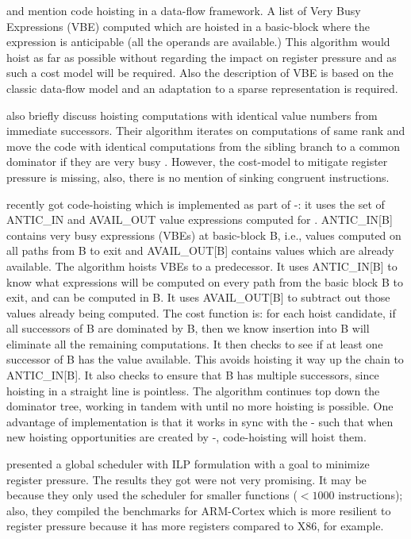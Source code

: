 \documentclass[sigplan,10pt,review,anonymous]{acmart}\settopmatter{printfolios=true,printccs=false,printacmref=false}
\begin{document}
\citet{dhamdhere1988fast} and \citet{steven1997advanced} mention
code hoisting in a data-flow framework. A list of Very Busy Expressions (VBE)
computed which are hoisted in a basic-block where the expression is
anticipable (all the operands are available.) This algorithm would hoist as far
as possible without regarding the impact on register pressure and as such a cost
model will be required.  Also the description of VBE is based on the classic
data-flow model and an adaptation to a sparse \SSA{} representation is required.

\citet{rosen1988global} also briefly discuss hoisting computations with
identical value numbers from immediate successors. Their algorithm iterates on
computations of same rank and move the code with identical computations from the
sibling branch to a common dominator if they are very busy
\cite{steven1997advanced}. However, the cost-model to mitigate register pressure
is missing, also, there is no mention of sinking congruent instructions.

\GCC{} recently got code-hoisting \cite{GCCCodeHoisting} which is implemented as
part of \GVN{}-\PRE{}: it uses the set of ANTIC\_IN and AVAIL\_OUT value
expressions computed for \PRE{}. ANTIC\_IN[B] contains very busy expressions
(VBEs) at basic-block B, i.e., values computed on all paths from B to exit and
AVAIL\_OUT[B] contains values which are already available. The algorithm hoists
VBEs to a predecessor.  It uses ANTIC\_IN[B] to know what expressions will be
computed on every path from the basic block B to exit, and can be computed in B.
It uses AVAIL\_OUT[B] to subtract out those values already being computed.  The
cost function is: for each hoist candidate, if all successors of B are dominated
by B, then we know insertion into B will eliminate all the remaining
computations.  It then checks to see if at least one successor of B has the
value available.  This avoids hoisting it way up the chain to ANTIC\_IN[B].  It
also checks to ensure that B has multiple successors, since hoisting in a
straight line is pointless.  The algorithm continues top down the dominator
tree, working in tandem with \PRE{} until no more hoisting is possible.  One
advantage of \GCC{} implementation is that it works in sync with the
\GVN{}-\PRE{} such that when new hoisting opportunities are created by
\GVN{}-\PRE{}, code-hoisting will hoist them.

\citet{barany2013} presented a global scheduler with ILP formulation with
a goal to minimize register pressure. The results they got were not very
promising. It may be because they only used the scheduler for smaller functions
($<1000$ instructions); also, they compiled the benchmarks for ARM-Cortex which
is more resilient to register pressure because it has more registers compared to
X86, for example.
\end{document}
